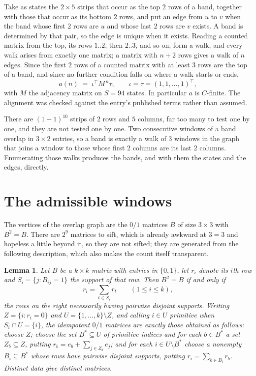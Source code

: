 \documentclass[11pt,a4paper]{article}
\theoremstyle{plain}
\newtheorem{lemma}[theorem]{Lemma}
\theoremstyle{definition}
\begin{document}
Take as states the $2\times5$ strips that occur as the top $2$ rows of a band,
together with those that occur as its bottom $2$ rows, and put an edge from $u$ to $v$
when the band whose first $2$ rows are $u$ and whose last $2$ rows are $v$ exists.
A band is determined by that pair, so the edge is unique when it exists. Reading a counted
matrix from the top, its rows $1..2$, then $2..3$, and so on, form a walk, and every
walk arises from exactly one matrix; a matrix with $n+2$ rows gives a walk of $n$ edges.
Since the first $2$ rows of a counted matrix with at least $3$ rows are the top of a
band, and since no further condition falls on where a walk starts or ends,
\[
a(n)\;=\;\iota^{\!\top}M^{\,n}\tau ,\qquad \iota=\tau=(1,1,\dots,1)^{\!\top},
\]
with $M$ the adjacency matrix on $S=94$ states. In particular $a$ is $C$-finite. The
alignment was checked against the entry's published terms rather than assumed.

There are $(1 + 1)^{10}$ strips of $2$ rows and $5$ columns, far too
many to test one by one, and they are not tested one by one. Two consecutive windows of a band
overlap in $3\times2$ entries, so a band is exactly a walk of $3$ windows in
the graph that joins a window to those whose first $2$ columns are its last $2$
columns. Enumerating those walks produces the bands, and with them the states and the edges,
directly.

\section{The admissible windows}

The vertices of the overlap graph are the $0/1$ matrices $B$ of size $3\times3$ with
$B^2=B$. There are $2^{9}$ matrices to sift, which is already awkward at $3=3$ and
hopeless a little beyond it, so they are not sifted; they are generated from the following
description, which also makes the count itself transparent.

\begin{lemma}\label{lem:idem}
Let $B$ be a $k\times k$ matrix with entries in $\{0,1\}$, let $r_i$ denote its $i$th row and
$S_i=\{j:B_{ij}=1\}$ the support of that row. Then $B^2=B$ if and only if
\[
r_i=\sum_{t\in S_i}r_t \qquad (1\le i\le k),
\]
the rows on the right necessarily having pairwise disjoint supports. Writing
$Z=\{i:r_i=0\}$ and $U=\{1,\dots,k\}\setminus Z$, and calling $i\in U$ \emph{primitive}
when $S_i\cap U=\{i\}$, the idempotent $0/1$ matrices are exactly those obtained as follows:
choose $Z$; choose the set $B^{\ast}\subseteq U$ of primitive indices and for each
$b\in B^{\ast}$ a set $Z_b\subseteq Z$, putting $r_b=e_b+\sum_{j\in Z_b}e_j$; and for each
$i\in U\setminus B^{\ast}$ choose a nonempty $B_i\subseteq B^{\ast}$ whose rows have
pairwise disjoint supports, putting $r_i=\sum_{b\in B_i}r_b$. Distinct data give distinct
matrices.
\end{lemma}
\end{document}
